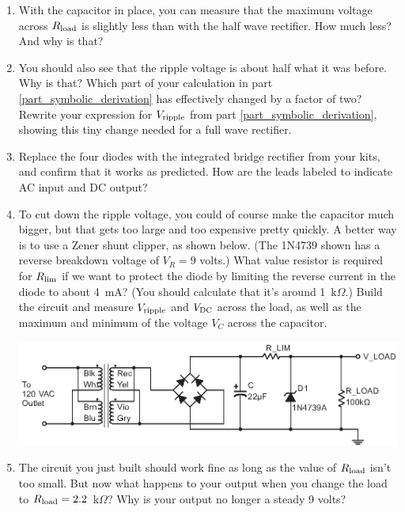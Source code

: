 \begin{enumerate}[wide]
\item With the capacitor in place, you can measure that the maximum voltage across $R_{\rm load}$ is slightly less than with the half wave rectifier.  How much less?  And why is that?

\item You should also see that the ripple voltage is about half what it was before.  Why is that?  Which part of your calculation in part \ref{part_symbolic_derivation} has effectively changed by a factor of two?  Rewrite your expression for $V_{\rm ripple}$ from part \ref{part_symbolic_derivation}, showing this tiny change needed for a full wave rectifier.  \label{part_symbolic_derivation_2f}

\item Replace the four diodes with the integrated bridge rectifier from your kits, and confirm that it works as predicted.  How are the leads labeled to indicate AC input and DC output?

\item To cut down the ripple voltage, you could of course make the capacitor much bigger, but that gets too large and too expensive pretty quickly.  A better way is to use a Zener shunt clipper, as shown below.  (The 1N4739 shown has a reverse breakdown voltage of $V_R=9$ volts.)  What value resistor is required for $R_{\rm lim}$ if we want to protect the diode by limiting the reverse current in the diode to about 4~mA?  (You should calculate that it's around 1~k$\Omega$.) Build the circuit and measure $V_{\rm ripple}$ and $V_{\rm DC}$ across the load, as well as the maximum and minimum of the voltage $V_C$ across the capacitor.  \label{part_zener_regulator}
\begin{center}
\includegraphics{power_supply/zener_regulator.eps}
\end{center}

\item The circuit you just built should work fine as long as the value of $R_{\rm load}$ isn't too small.  But now what happens to your output when you change the load to $R_{\rm load} = 2.2$~k$\Omega$?  Why is your output no longer a steady 9 volts?


\end{enumerate}
